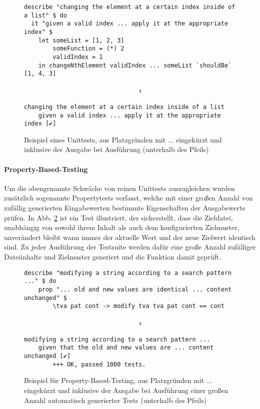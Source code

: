 \begin{figure}
    \caption{Beispiel eines Unittests, aus Platzgründen mit ... eingekürzt und inklusive
        der Ausgabe bei Ausführung (unterhalb des Pfeils)}
    \label{unit-test}
    \begin{verbatim}
describe "changing the element at a certain index inside of a list" $ do
  it "given a valid index ... apply it at the appropriate index" $
    let someList = [1, 2, 3]
        someFunction = (*) 2
        validIndex = 1
    in changeNthElement validIndex ... someList `shouldBe` [1, 4, 3]

                                ↓

changing the element at a certain index inside of a list
    given a valid index ... apply it at the appropriate index [✔]
    \end{verbatim}
\end{figure}

\paragraph{\gls{Property-Based-Testing}}
Um die obengenannte Schwäche von reinen Unittests auszugleichen wurden zusätzlich
sogenannte Propertytests verfasst, welche mit einer großen Anzahl von zufällig generierten
Eingabewerten bestimmte Eigenschaften der Ausgabewerte prüfen. In Abb. \ref{property-test}
ist ein Test illustriert, der sicherstellt, dass die Zieldatei, unabhängig von
sowohl ihrem Inhalt als auch dem konfigurierten \gls{Zielmuster}, unverändert
bleibt wann immer der aktuelle Wert und der neue Zielwert identisch sind. Zu
jeder Ausführung der Testsuite werden dafür eine große Anzahl zufälliger Dateiinhalte
und Zielmuster generiert und die Funktion damit geprüft.

\begin{figure}
    \caption{Beispiel für \gls{Property-Based-Testing}, aus Platzgründen mit ... eingekürzt und inklusive
        der Ausgabe bei Ausführung einer großen Anzahl automatisch generierter Tests (unterhalb des Pfeils)}
    \label{property-test}
    \begin{verbatim}
describe "modifying a string according to a search pattern ..." $ do
    prop "... old and new values are identical ... content unchanged" $
        \tva pat cont -> modify tva tva pat cont == cont

                                ↓

modifying a string according to a search pattern ...
    given that the old and new values are ... content unchanged [✔]
        +++ OK, passed 1000 tests.
    \end{verbatim}
\end{figure}

